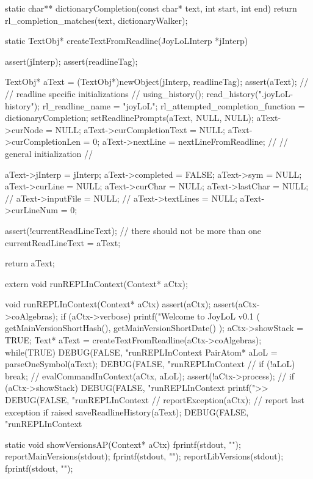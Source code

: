 static char** dictionaryCompletion(const char* text, int start, int end) {
 return rl_completion_matches(text, dictionaryWalker);
}
\stopCCode

\startCCode
static TextObj* createTextFromReadline(JoyLoLInterp *jInterp) {
  assert(jInterp);
  assert(readlineTag);
  
  TextObj* aText = (TextObj*)newObject(jInterp, readlineTag);
  assert(aText);
  //
  // readline specific initializations
  //
  using_history();
  read_history(".joyLoL-history");
  rl_readline_name = "joyLoL";
  rl_attempted_completion_function = dictionaryCompletion;
  setReadlinePrompts(aText, NULL, NULL);
  aText->curNode = NULL;
  aText->curCompletionText = NULL;
  aText->curCompletionLen  = 0;
  aText->nextLine = nextLineFromReadline;
  //
  // general initialization
  //

  aText->jInterp    = jInterp;
  aText->completed  = FALSE;
  aText->sym        = NULL;
  aText->curLine    = NULL;
  aText->curChar    = NULL;
  aText->lastChar   = NULL;
  //
  aText->inputFile = NULL;
  //
  aText->textLines  = NULL;
  aText->curLineNum = 0;

  assert(!currentReadLineText); // there should not be more than one
  currentReadLineText = aText;

  return aText;
}
\stopCCode

\startCHeader
extern void runREPLInContext(Context* aCtx);
\stopCHeader

\startCCode
void runREPLInContext(Context* aCtx) {
  assert(aCtx);
  assert(aCtx->coAlgebras);
  if (aCtx->verbose) {
    printf("Welcome to JoyLoL v0.1 ( %
      getMainVersionShortHash(),
      getMainVersionShortDate()
    );
  }
  aCtx->showStack = TRUE;
  Text* aText = createTextFromReadline(aCtx->coAlgebras);
  while(TRUE) {
    DEBUG(FALSE, "runREPLInContext %
    PairAtom* aLoL = parseOneSymbol(aText);
    DEBUG(FALSE, "runREPLInContext %
    //
    if (!aLoL) break;
    //
    evalCommandInContext(aCtx, aLoL);
    assert(!aCtx->process);
    //
    if (aCtx->showStack) {
      DEBUG(FALSE, "runREPLInContext %
      printf(">>%
      DEBUG(FALSE, "runREPLInContext %
    }
    //
    reportException(aCtx); // report last exception if raised
  }
  saveReadlineHistory(aText);
  DEBUG(FALSE, "runREPLInContext %
}
\stopCCode

\starttyping
static void showVersionsAP(Context* aCtx) {
  fprintf(stdout, "\n");
  reportMainVersions(stdout);
  fprintf(stdout, "\n");
  reportLibVersions(stdout);
  fprintf(stdout, "\n");
}
\stoptyping